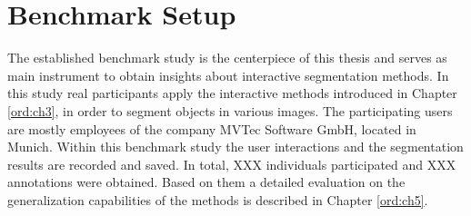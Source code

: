 
\chapter{Benchmark Setup}\label{ord:ch4}


The established benchmark study is the centerpiece of this thesis and serves as main instrument to obtain insights about interactive segmentation methods.
In this study real participants apply the interactive methods introduced in Chapter \ref{ord:ch3}, in order to segment objects in various images.
The participating users are mostly employees of the company MVTec Software GmbH, located in Munich.
Within this benchmark study the user interactions and the segmentation results are recorded and saved.
In total, XXX individuals participated and XXX annotations were obtained.
Based on them a detailed evaluation on the generalization capabilities of the methods is described in Chapter \ref{ord:ch5}.






